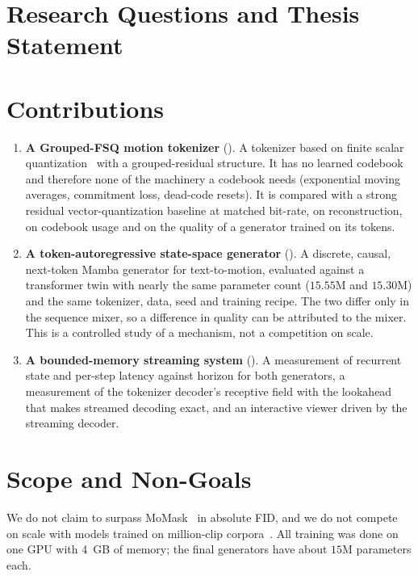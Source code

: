 \section{Research Questions and Thesis Statement}
\label{sec:intro_questions}


\section{Contributions}
\label{sec:intro_contributions}

\begin{enumerate}
\item \textbf{A Grouped-FSQ motion tokenizer} (). A tokenizer based on finite scalar quantization~\cite{mentzer2023fsq} with a grouped-residual structure. It has no learned codebook and therefore none of the machinery a codebook needs (exponential moving averages, commitment loss, dead-code resets). It is compared with a strong residual vector-quantization baseline at matched bit-rate, on reconstruction, on codebook usage and on the quality of a generator trained on its tokens.

\item \textbf{A token-autoregressive state-space generator} (). A discrete, causal, next-token Mamba generator for text-to-motion, evaluated against a transformer twin with nearly the same parameter count ($15.55$M and $15.30$M) and the same tokenizer, data, seed and training recipe. The two differ only in the sequence mixer, so a difference in quality can be attributed to the mixer. This is a controlled study of a mechanism, not a competition on scale.

\item \textbf{A bounded-memory streaming system} (). A measurement of recurrent state and per-step latency against horizon for both generators, a measurement of the tokenizer decoder's receptive field with the lookahead that makes streamed decoding exact, and an interactive viewer driven by the streaming decoder.
\end{enumerate}

\section{Scope and Non-Goals}
\label{sec:intro_scope}

We do not claim to surpass MoMask~\cite{guo2024momask} in absolute FID, and we do not compete on scale with models trained on million-clip corpora~\cite{wang2024beingm0,zhang2024lmm,fan2025motionmillion}. All training was done on one GPU with 4~GB of memory; the final generators have about $15$M parameters each.

